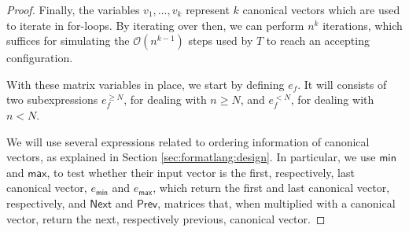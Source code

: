 \begin{proof}
    Finally, the variables $v_1,\ldots,v_{k}$ represent $k$ canonical vectors  which are used to iterate 
    in for-loops. By iterating over then, we can perform $n^{k}$ iterations, 
    which suffices for simulating the $\mathcal{O}(n^{k-1})$ steps used by $T$ to reach an accepting configuration.


    With these matrix variables in place, we start by defining $e_f$. It will consists of two subexpressions
    $e_f^{\geq N}$, for dealing with $n\geq N$, and $e_f^{<N}$, for dealing with $n<N$. 



    We will use several expressions related to ordering information of canonical vectors, as explained in Section \ref{sec:formatlang:design}.
	In particular, we use $\mathsf{min}$ and $\mathsf{max}$, to test whether their input vector is the first, respectively, last canonical
	vector, $e_{\mathsf{min}}$ and $e_{\mathsf{max}}$, which return the first and last canonical vector, respectively, and $\mathsf{Next}$
	and $\mathsf{Prev}$, matrices that, when multiplied with a canonical vector, return the next, respectively previous, canonical vector.

\end{proof}
